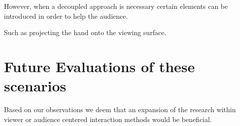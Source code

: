 \documentclass[review,journal]{vgtc}         %
\begin{document}
However, when a decoupled approach is necessary certain elements can be introduced in order to help the audience.

Such as projecting the hand onto the viewing surface.

\section{Future Evaluations of these scenarios}\label{sec:future}

Based on our observations we deem that an expansion of the research within viewer or audience centered interaction methods would be beneficial.



\end{document}
